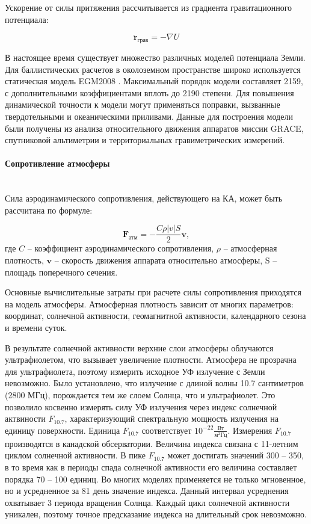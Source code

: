 Ускорение от силы притяжения рассчитывается из градиента гравитационного потенциала:

\begin{equation*}
    \ddot{\mathbf{r}}_{\text{грав}} = -\nabla U
\end{equation*}

В настоящее время существует множество различных моделей потенциала Земли.
Для баллистических расчетов в околоземном пространстве широко используется статическая модель EGM2008 \cite{pavlis2012}.
Максимальный порядок модели составляет 2159, с дополнительными коэффициентами вплоть до 2190 степени.
Для повышения динамической точности к модели могут применяться поправки, вызванные
твердотельными и океаническими приливами. Данные для построения модели были получены из
анализа относительного движения аппаратов миссии GRACE, спутниковой альтиметрии и 
территориальных гравиметрических измерений. 

\paragraph{Сопротивление атмосферы} \mbox{} \\

Сила аэродинамического сопротивления, действующего на КА, может быть рассчитана по формуле:

\begin{equation*}
    \mathbf{F}_{\text{атм}} = - \frac{C \rho |v| S}{2} \mathbf{v},
\end{equation*}
где $C$ -- коэффициент аэродинамического сопротивления, $\rho$ -- атмосферная плотность,
$\mathbf{v}$ -- скорость движения аппарата относительно атмосферы, S -- площадь поперечного сечения.

Основные вычислительные затраты при расчете силы сопротивления приходятся на модель атмосферы.
Атмосферная плотность зависит от многих параметров: координат, солнечной активности,
геомагнитной активности, календарного сезона и времени суток.

В результате солнечной активности верхние слои атмосферы облучаются ультрафиолетом,
что вызывает увеличение плотности. Атмосфера не прозрачна для ультрафиолета,
поэтому измерить исходное УФ излучение с Земли невозможно. Было установлено, что
излучение с длиной волны 10.7 сантиметров (2800 МГц), порождается тем же слоем Солнца, что и
ультрафиолет. Это позволило косвенно измерять силу УФ излучения через индекс
солнечной актвиности $F_{10.7}$, характеризующий спектральную мощность излучения на единицу поверхности. Единица $F_{10.7}$ соответствует
$10^{-22} \frac{\text{Вт}}{\text{м}^2 \text{Гц}}$. 
Измерения $F_{10.7}$ производятся в канадской обсерватории. 
Величина индекса связана с 11-летним циклом солнечной активности. 
В пике $F_{10.7}$ может достигать значений 300 -- 350, в то время как в периоды спада
солнечной активности его величина составляет порядка 70 -- 100 единиц. 
Во многих моделях применяется не только мгновенное, но и усредненное за 81 день значение индекса.
Данный интервал усреднения охватывает 3 периода вращения Солнца. 
Каждый цикл солнечной активности уникален, 
поэтому точное предсказание индекса на длительный срок невозможно.

